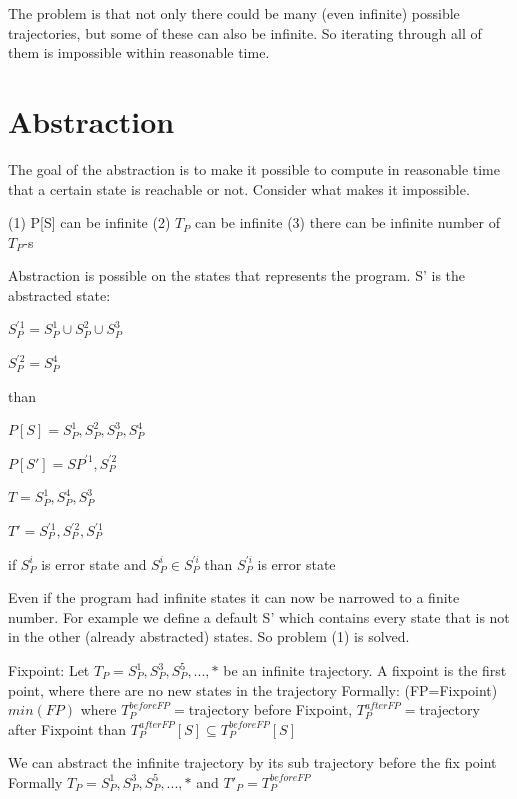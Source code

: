 The problem is that not only there could be many (even infinite) possible trajectories, but some of these can also be infinite. So iterating through all of them is impossible within reasonable time.


\section{Abstraction}
\label{sec:abstraction}

The goal of the abstraction is to make it possible to compute in reasonable time that a certain state is reachable or not. Consider what makes it impossible.

(1) P[S] can be infinite
(2) $T_{P}$ can be infinite
(3) there can be infinite number of $T_{P}$-s
  
Abstraction is possible on the states that represents the program. S' is the abstracted state:

$S_{P}^{'1}=S_{P}^{1} \cup S_{P}^{2} \cup S_{P}^{3}$

$S_{P}^{'2}=S_{P}^{4}$

than

$P[S]={S_{P}^{1}, S_{P}^{2}, S_{P}^{3}, S_{P}^{4}}$

$P[S']={S{P}^{'1}, S_{P}^{'2}}$

$T={S_{P}^{1}, S_{P}^{4}, S_{P}^{3}}$

$T'={S_{P}^{'1}, S_{P}^{'2}, S_{P}^{'1}}$

if $S_{P}^{i}$ is error state and $S_{P}^{i} \in S_{P}^{'i}$ than $S_{P}^{'i}$ is error state

Even if the program had infinite states it can now be narrowed to a finite number. For example we define a default S' which contains every state that is not in the other (already abstracted) states. So problem (1) is solved.
 
Fixpoint: Let $T_{P}={S_{P}^{1}, S_{P}^{3}, S_{P}^{5}, ..., *}$ be an infinite trajectory. A fixpoint is the first point, where there are no new states in the trajectory
Formally: (FP=Fixpoint) $min(FP)$ where $T_{P}^{before FP}=$trajectory before Fixpoint, $T_{P}^{after FP}=$trajectory after Fixpoint than $T_{P}^{after FP}[S] \subseteq T_{P}^{before FP}[S]$

We can abstract the infinite trajectory by its sub trajectory before the fix point
Formally  $T_{P}={S_{P}^{1}, S_{P}^{3}, S_{P}^{5}, ..., *}$ and $T'_{P}= T_{P}^{before FP}$ 

